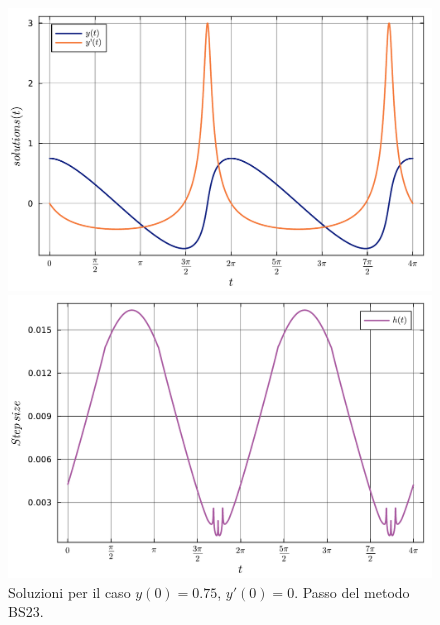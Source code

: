 \documentclass[letterpaper, 12pt]{article}
\numberwithin{equation}{section}    %
\begin{document}
\begin{figure}[!ht]
    \centering
    \begin{minipage}[b]{0.47\textwidth}
        \includegraphics[width=\textwidth]{6365.pdf}
    \end{minipage}
    \hspace{0.5cm}
    \begin{minipage}[b]{0.47\textwidth}
        \includegraphics[width=\textwidth]{6366.pdf}
    \end{minipage}
    \caption{Soluzioni per il caso $y(0) = 0.75$, $y'(0) = 0$. Passo del metodo BS23.}
    \label{fig:es6_3_6_3}
\end{figure}
\end{document}
